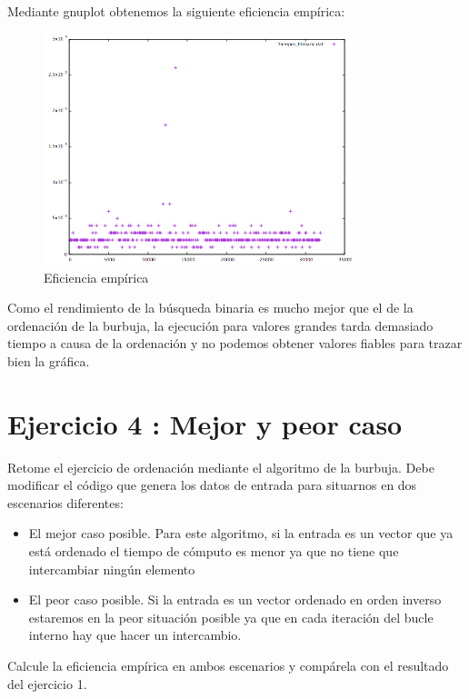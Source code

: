 \documentclass{article}
\begin{document}
	Mediante gnuplot obtenemos la siguiente eficiencia empírica:
	\begin{figure}[H]
  		\caption{Eficiencia empírica}
  		\centering
  		\includegraphics[width=0.8\textwidth]{ejer3/grafica.png}
	\end{figure}
	
	Como el rendimiento de la búsqueda binaria es mucho mejor que el de la ordenación de la burbuja, la ejecución para valores grandes tarda demasiado tiempo a causa de la ordenación y no podemos obtener valores fiables para trazar bien la gráfica.

\clearpage
\section{Ejercicio 4 : Mejor y peor caso}
Retome el ejercicio de ordenación mediante el algoritmo de la burbuja. Debe modificar el
código que genera los datos de entrada para situarnos en dos escenarios diferentes:
\begin{itemize}
	\item El mejor caso posible. Para este algoritmo, si la entrada es un vector que ya está ordenado el tiempo de cómputo es menor ya que no tiene que intercambiar ningún elemento
	\item El peor caso posible. Si la entrada es un vector ordenado en orden inverso estaremos en la peor situación posible ya que en cada iteración del bucle interno hay que hacer un intercambio.
\end{itemize}
	Calcule la eficiencia empírica en ambos escenarios y compárela con el resultado del ejercicio 1.
\clearpage
\end{document}
